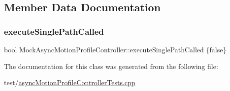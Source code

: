 \subsection{Member Data Documentation}
\mbox{\label{classMockAsyncMotionProfileController_ab535ac6b1a0e1d6278524827c7431ed5}} 
\subsubsection{\texorpdfstring{executeSinglePathCalled}{executeSinglePathCalled}}
{\footnotesize\ttfamily bool Mock\+Async\+Motion\+Profile\+Controller\+::execute\+Single\+Path\+Called \{false\}}



The documentation for this class was generated from the following file\+:\begin{DoxyCompactItemize}
\item 
test/\mbox{\hyperlink{asyncMotionProfileControllerTests_8cpp}{async\+Motion\+Profile\+Controller\+Tests.\+cpp}}\end{DoxyCompactItemize}
